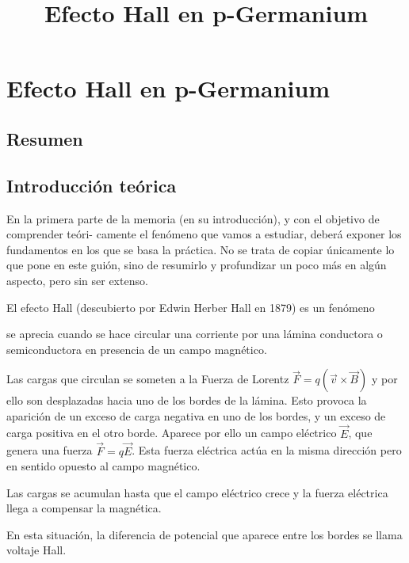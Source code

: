 \documentclass[a4paper,12pt,spanish]{report}
\begin{document}
	
	
	\title{ Efecto Hall en p-Germanium}
	
	\date{}
	
	\maketitle
	
	\tableofcontents
	
	\chapter{Efecto Hall en p-Germanium}

	\section{Resumen}
	
	
	
	
	\section{Introducción teórica}
	
	
	En la primera parte de la memoria (en su introducción), y con el objetivo de comprender teóri-
	camente el fenómeno que vamos a estudiar, deberá exponer los fundamentos en los que se basa la
	práctica. No se trata de copiar únicamente lo que pone en este guión, sino de resumirlo y profundizar
	un poco más en algún aspecto, pero sin ser extenso.
	
	
	 El efecto Hall (descubierto por Edwin Herber Hall en 1879) es un fenómeno 
	 
	 se aprecia cuando se hace circular una corriente por una lámina conductora o semiconductora en presencia de un campo magnético. 
	 
	 Las cargas que circulan se someten a la Fuerza de Lorentz $\vec{F} = q(\vec{v} \times \vec{B})$ y por ello son desplazadas hacia uno de los bordes de la lámina. Esto provoca la aparición de un exceso de carga negativa en uno de los bordes, y un exceso de carga positiva en el otro borde. Aparece por ello un campo eléctrico $\vec{E}$, que genera una fuerza $\vec{F}= q \vec{E}$. Esta fuerza eléctrica actúa en la misma dirección pero en sentido opuesto al campo magnético. 
	
	Las cargas se acumulan hasta que el campo eléctrico crece y la fuerza eléctrica llega a compensar la magnética. 
	
	En esta situación, la diferencia de potencial que aparece entre los bordes se llama voltaje Hall. 
	
\end{document}
